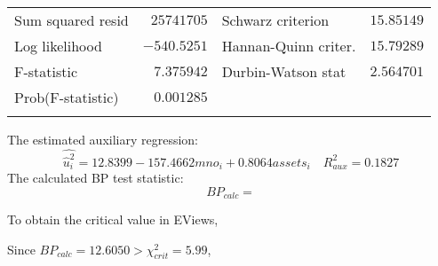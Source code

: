 \documentclass[12pt]{report}
\begin{document}
\begin{table}[!htbp]
\begin{tabular}{lrrrr}
		\multicolumn{1}{l}{Sum squared resid}&\multicolumn{1}{r}{$25741705$}&\multicolumn{2}{l}{Schwarz criterion}&\multicolumn{1}{r}{$15.85149$}\\
		\multicolumn{1}{l}{Log likelihood}&\multicolumn{1}{r}{$-540.5251$}&\multicolumn{2}{l}{Hannan-Quinn criter.}&\multicolumn{1}{r}{$15.79289$}\\
		\multicolumn{1}{l}{F-statistic}&\multicolumn{1}{r}{$7.375942$}&\multicolumn{2}{l}{Durbin-Watson stat}&\multicolumn{1}{r}{$2.564701$}\\
		\multicolumn{1}{l}{Prob(F-statistic)}&\multicolumn{1}{r}{$0.001285$}&\multicolumn{1}{c}{}&\multicolumn{1}{c}{}&\multicolumn{1}{c}{}\\
		[4.5pt] \hline \\ [-4.5pt]
	\end{tabular}
\end{table} \vspace{-\baselineskip}\noindent
The estimated auxiliary regression: $$\widehat{\hat{u}^2_i} = 12.8399 - 157.4662 mno_i + 0.8064 assets_i \quad R^2_{aux} = 0.1827$$ The calculated BP test statistic:
$$BP_{calc} = $$

\noindent To obtain the critical value in EViews,
\begin{figure}[H]
	\centering
\end{figure}
\vspace{-\baselineskip}
\begin{figure}[H]
	\centering
\end{figure}
\vspace{-\baselineskip}

\noindent Since $BP_{calc} = 12.6050 > \chi^2_{crit} = 5.99$, 
\end{document}
